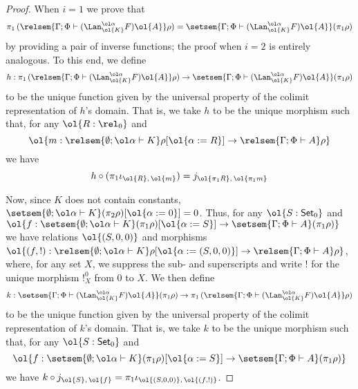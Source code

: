 \documentclass{lmcs}
\theoremstyle{plain}\newtheorem{satz}[thm]{Satz}
\newcommand{\set}{\mathsf{Set}}
\begin{document}
\begin{proof}
When $i = 1$ we prove that
\[
\pi_1 \,( \relsem{ \Gamma; \Phi \vdash (\Lan^{\ol \alpha}_{\ol{K}}
  F)\ol{A} } \rho ) = \setsem{ \Gamma; \Phi \vdash (\Lan^{\ol
    \alpha}_{\ol{K}} F)\ol{A} } (\pi_1 \rho)
\]
by
providing a pair of inverse functions; the proof when $i=2$ is
entirely analogous. To this end, we define
\[
h : \pi_1\, ( \relsem{ \Gamma; \Phi \vdash (\Lan^{\ol \alpha}_{\ol{K}}
  F)\ol{A} } \rho ) \to \setsem{ \Gamma; \Phi \vdash (\Lan^{\ol
    \alpha}_{\ol{K}} F)\ol{A} } (\pi_1 \rho)
\]
to be the unique function given by the universal property of the
colimit representation of $h$'s domain. That is, we take $h$ to be the
unique morphism such that, for any $\ol{R : \rel_0}$ and
\[\ol{m :
  \relsem{ \emptyset; \ol\alpha \vdash K } \rho[\ol{\alpha := R}] \to
  \relsem{ \Gamma; \Phi \vdash A } \rho}\] we have
\begin{equation}\label{eq:cocone-proj}
h \circ (\pi_1 \iota_{\ol{R},\, \ol{m}}) = j_{\ol{\pi_1 R},
  \,\ol{\pi_1 m}}
\end{equation}

Now, since $K$ does not contain constants, $\setsem{ \emptyset;
  \ol\alpha \vdash K } (\pi_2 \rho) [\ol{\alpha := 0}] = 0$. Thus, for
any $\ol{S : \set_0}$ and $\ol{f : \setsem{ \emptyset; \ol\alpha
    \vdash K } (\pi_1 \rho)[\ol{\alpha := S}] \to \setsem{ \Gamma;
    \Phi \vdash A } (\pi_1 \rho)} $ we have relations $\ol{(S, 0, 0)}$
and morphisms $\ol{(f, !) : \relsem{ \emptyset; \ol\alpha \vdash K }
  \rho[\ol{\alpha := (S, 0, 0)}] \to \relsem{ \Gamma; \Phi \vdash A }
  \rho}$, where, for any set $X$, we suppress the sub- and
superscripts and write $!$ for the unique morphism $!^0_X$ from $0$ to
$X$. We then define
\[
k : \setsem{ \Gamma; \Phi \vdash (\Lan^{\ol \alpha}_{\ol{K}} F)\ol{A}
} (\pi_1 \rho) \to \pi_1 \,( \relsem{ \Gamma; \Phi \vdash (\Lan^{\ol
    \alpha}_{\ol{K}} F)\ol{A} } \rho )
\]
to be the unique function given by the universal property of the
colimit representation of $k$'s domain. That is, we take $k$ to be the
unique morphism such that, for any $\ol{S : \set_0}$ and \[\ol{f :
  \setsem{ \emptyset; \ol\alpha \vdash K } (\pi_1 \rho)[\ol{\alpha :=
      S}] \to \setsem{ \Gamma; \Phi \vdash A } (\pi_1 \rho)}\] we have
$k \circ j_{\ol{S},\, \ol{f}} = \pi_1 \iota_{\ol{(S, 0, 0)},\, \ol{(f,
    !)}}$.


\end{proof}
\end{document}
